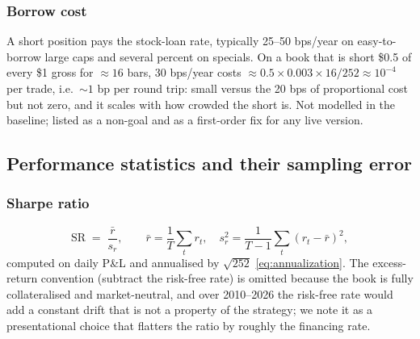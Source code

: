 \subsubsection{Borrow cost}

A short position pays the stock-loan rate, typically 25--50 bps/year on easy-to-borrow
large caps and several percent on specials. On a book that is short \$0.5 of every \$1
gross for $\approx16$ bars, 30 bps/year costs $\approx0.5\times0.003\times16/252\approx
10^{-4}$ per trade, i.e.\ $\sim1$ bp per round trip: small versus the 20 bps of
proportional cost but not zero, and it scales with how crowded the short is. Not modelled
in the baseline; listed as a non-goal and as a first-order fix for any live version.

\subsection{Performance statistics and their sampling error}
\label{sec:bt:stats}

\subsubsection{Sharpe ratio}

\begin{equation}
  \widehat{\mathrm{SR}} \;=\; \frac{\bar r}{s_r},
  \qquad
  \bar r=\frac1T\sum_t r_t,\quad
  s_r^2=\frac{1}{T-1}\sum_t(r_t-\bar r)^2 ,
  \label{eq:sharpe}
\end{equation}
computed on daily P\&L and annualised by $\sqrt{252}$ \eqref{eq:annualization}. The
excess-return convention (subtract the risk-free rate) is omitted because the book is
fully collateralised and market-neutral, and over 2010--2026 the risk-free rate would add
a constant drift that is not a property of the strategy; we note it as a presentational
choice that flatters the ratio by roughly the financing rate.

